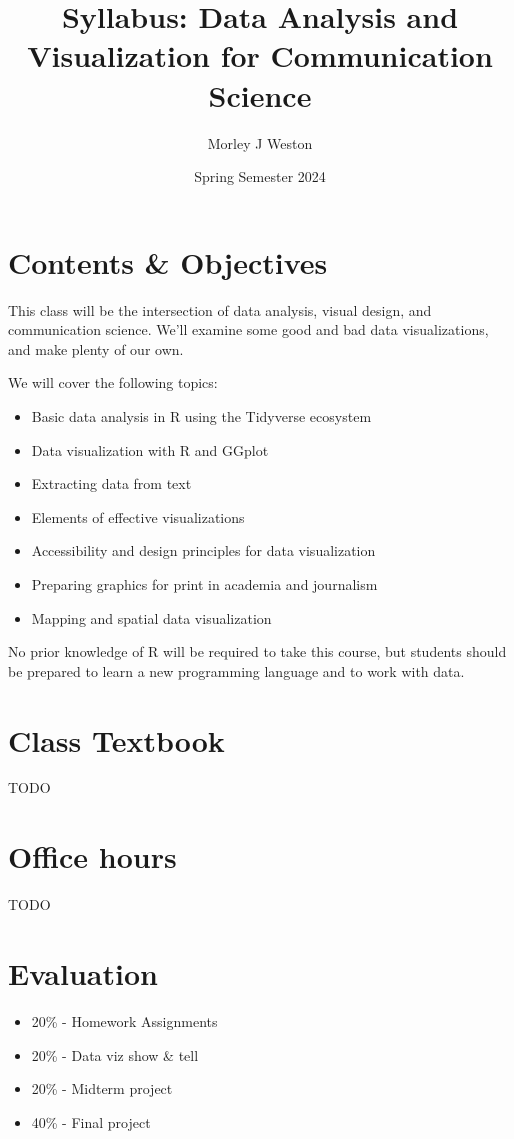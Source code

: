 \documentclass{article}
\title{Syllabus: Data Analysis and Visualization for Communication Science}
\author{Morley J Weston}
\date{Spring Semester 2024}
\begin{document}
\maketitle

\section*{Contents \& Objectives}
This class will be the intersection of data analysis, visual design, and communication science. We'll examine some good and bad data visualizations, and make plenty of our own.

We will cover the following topics:

\begin{itemize}
    \item Basic data analysis in R using the Tidyverse ecosystem
    \item Data visualization with R and GGplot
    \item Extracting data from text
    \item Elements of effective visualizations
    \item Accessibility and design principles for data visualization
    \item Preparing graphics for print in academia and journalism
    \item Mapping and spatial data visualization
\end{itemize}

No prior knowledge of R will be required to take this course, but students should be prepared to learn a new programming language and to work with data.

\section*{Class Textbook}

TODO

\section*{Office hours}

TODO

\section*{Evaluation}
\begin{itemize}
    \item 20\% - Homework Assignments
    \item 20\% - Data viz show \& tell
    \item 20\% - Midterm project
    \item 40\% - Final project
\end{itemize}
\end{document}
